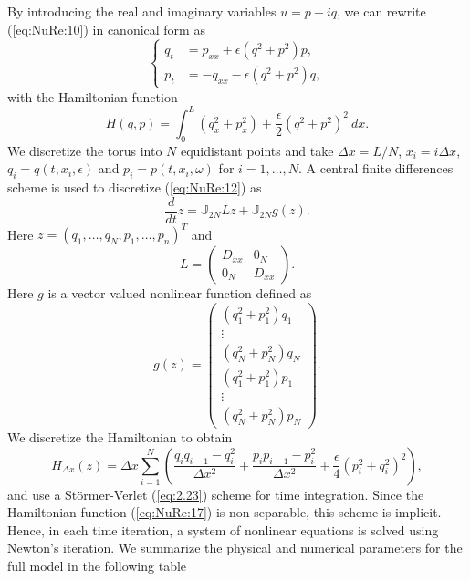 By introducing the real and imaginary variables $u = p + iq$, we can rewrite (\ref{eq:NuRe:10}) in canonical form as
\begin{equation} \label{eq:NuRe:12}
\left\{
\begin{aligned}
 q_t &= p_{xx} + \epsilon (q^2+p^2)p, \\
 p_t &= -q_{xx} - \epsilon (q^2 + p^2)q,
\end{aligned}
\right.
\end{equation}
with the Hamiltonian function
\begin{equation} \label{eq:NuRe:13}
	H(q,p) = \int_{0}^{L} (q_x^2 + p_x^2) + \frac \epsilon 2 (q^2 + p^2)^2\ dx.
\end{equation}
We discretize the torus into $N$ equidistant points and take $\Delta x = L/N$, $x_i = i\Delta x$, $q_i=q(t,x_i,\epsilon)$ and $p_i = p(t,x_i,\omega)$ for $i = 1 ,\dots,N$. A central finite differences scheme is used to discretize (\ref{eq:NuRe:12}) as
\begin{equation}  \label{eq:NuRe:14}
	\frac{d}{dt} z = \mathbb J_{2N} Lz + \mathbb J_{2N} g(z).
\end{equation}
Here $z = (q_1,\dots,q_N,p_1,\dots,p_n)^T$ and
\begin{equation}  \label{eq:NuRe:15}
	L = 
	\begin{pmatrix}
		D_{xx} & 0_N \\
		0_N & D_{xx}
	\end{pmatrix}.
\end{equation}
Here $g$ is a vector valued nonlinear function defined as
\begin{equation}  \label{eq:NuRe:16}
	g(z) =
	\begin{pmatrix}
	(q_1^2 + p_1^2)q_1 \\
	\vdots \\
	(q_N^2 + p_N^2)q_N \\
	(q_1^2 + p_1^2)p_1 \\
	\vdots \\
	(q_N^2 + p_N^2)p_N
	\end{pmatrix}.
\end{equation}
We discretize the Hamiltonian to obtain
\begin{equation}  \label{eq:NuRe:17}
	H_{\Delta x}(z) = {\Delta x}\sum_{i=1}^{N} \left( \frac{q_i q_{i-1} - q_i^2}{\Delta x ^2} + \frac{p_i p_{i-1} - p_i^2}{\Delta x ^2} + \frac \epsilon 4 (p_i^2 + q_i^2)^2  \right),
\end{equation}
and use a St\"ormer-Verlet (\ref{eq:2.23}) scheme for time integration. Since the Hamiltonian function (\ref{eq:NuRe:17}) is non-separable, this scheme is implicit. Hence, in each time iteration, a system of nonlinear equations is solved using Newton's iteration. We summarize the physical and numerical parameters for the full model in the following table

